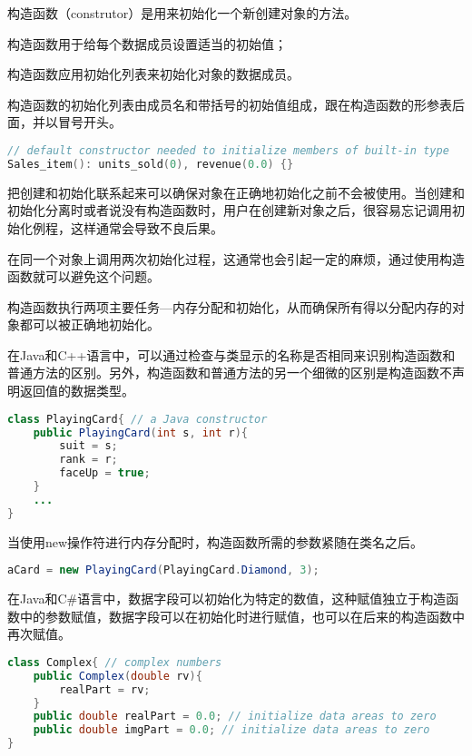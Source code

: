 构造函数（construtor）是用来初始化一个新创建对象的方法。

\begin{compactitem}
\item 构造函数用于给每个数据成员设置适当的初始值；
\item 构造函数应用初始化列表来初始化对象的数据成员。
\end{compactitem}

构造函数的初始化列表由成员名和带括号的初始值组成，跟在构造函数的形参表后面，并以冒号开头。

\begin{lstlisting}[language=C++]
// default constructor needed to initialize members of built-in type
Sales_item(): units_sold(0), revenue(0.0) {}
\end{lstlisting}

把创建和初始化联系起来可以确保对象在正确地初始化之前不会被使用。当创建和初始化分离时或者说没有构造函数时，用户在创建新对象之后，很容易忘记调用初始化例程，这样通常会导致不良后果。

在同一个对象上调用两次初始化过程，这通常也会引起一定的麻烦，通过使用构造函数就可以避免这个问题。

构造函数执行两项主要任务—内存分配和初始化，从而确保所有得以分配内存的对象都可以被正确地初始化。

在Java和C++语言中，可以通过检查与类显示的名称是否相同来识别构造函数和普通方法的区别。另外，构造函数和普通方法的另一个细微的区别是构造函数不声明返回值的数据类型。

\begin{lstlisting}[language=Java]
class PlayingCard{ // a Java constructor
	public PlayingCard(int s, int r){
		suit = s;
		rank = r;
		faceUp = true;
	}
	...
}
\end{lstlisting}


当使用new操作符进行内存分配时，构造函数所需的参数紧随在类名之后。


\begin{lstlisting}[language=Java]
aCard = new PlayingCard(PlayingCard.Diamond, 3);
\end{lstlisting}

在Java和C\#语言中，数据字段可以初始化为特定的数值，这种赋值独立于构造函数中的参数赋值，数据字段可以在初始化时进行赋值，也可以在后来的构造函数中再次赋值。



\begin{lstlisting}[language=Java]
class Complex{ // complex numbers
	public Complex(double rv){
		realPart = rv;
	}
	public double realPart = 0.0; // initialize data areas to zero
	public double imgPart = 0.0; // initialize data areas to zero
}
\end{lstlisting}

